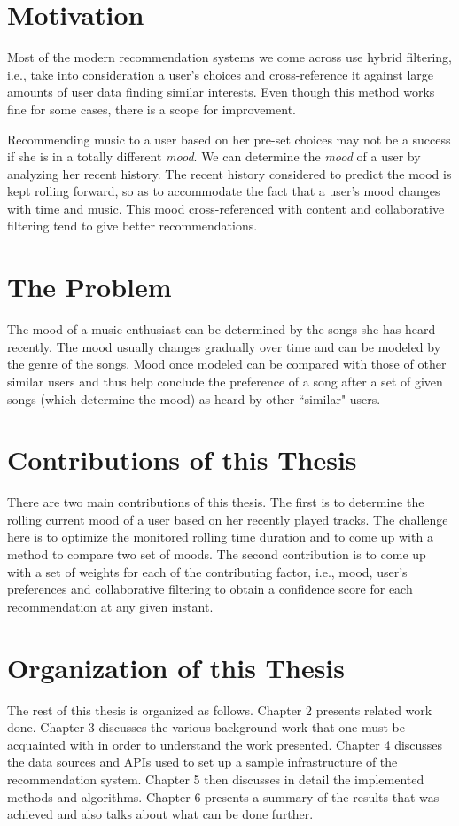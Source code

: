 	\section{Motivation}
		Most of the modern recommendation systems we come across use hybrid filtering, i.e., take into consideration a user's choices and cross-reference it against large amounts of user data finding similar interests. Even though this method works fine for some cases, there is a scope for improvement.

		Recommending music to a user based on her pre-set choices may not be a success if she is in a totally different \emph{mood}. We can determine the \emph{mood} of a user by analyzing her recent history. The recent history considered to predict the mood is kept rolling forward, so as to accommodate the fact that a user's mood changes with time and music. This mood cross-referenced with content and collaborative filtering tend to give better recommendations.

	\section{The Problem}
		The mood of a music enthusiast can be determined by the songs she has heard recently. The mood usually changes gradually over time and can be modeled by the genre of the songs. Mood once modeled can be compared with those of other similar users and thus help conclude the preference of a song after a set of given songs (which determine the mood) as heard by other ``similar" users.

	\section{Contributions of this Thesis}
		There are two main contributions of this thesis. The first is to determine the rolling current mood of a user based on her recently played tracks. The challenge here is to optimize the monitored rolling time duration and to come up with a method to compare two set of moods. The second contribution is to come up with a set of weights for each of the contributing factor, i.e., mood, user's preferences and collaborative filtering to obtain a confidence score for each recommendation at any given instant.

	\section{Organization of this Thesis}
		The rest of this thesis is organized as follows. Chapter 2 presents related work done. Chapter 3 discusses the various background work that one must be acquainted with in order to understand the work presented. Chapter 4 discusses the data sources and APIs used to set up a sample infrastructure of the recommendation system. Chapter 5 then discusses in detail the implemented methods and algorithms. Chapter 6 presents a summary of the results that was achieved and also talks about what can be done further.
